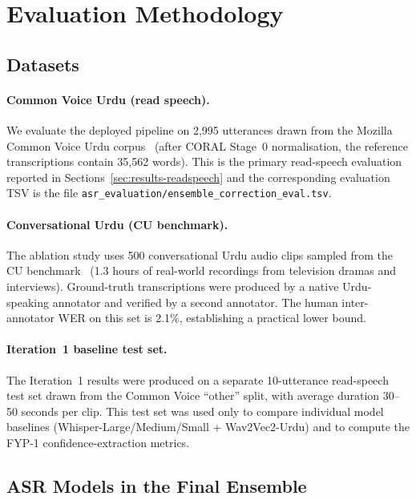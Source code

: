 \section{Evaluation Methodology}
\label{sec:eval-method}

\subsection{Datasets}
\label{ssec:datasets}

\paragraph{Common Voice Urdu (read speech).}
We evaluate the deployed pipeline on 2{,}995 utterances drawn from the Mozilla Common Voice Urdu corpus~\cite{ardila2020common} (after CORAL Stage~0 normalisation, the reference transcriptions contain 35{,}562 words). This is the primary read-speech evaluation reported in Sections~\ref{sec:results-readspeech} and the corresponding evaluation TSV is the file \texttt{asr\_evaluation/ensemble\_correction\_eval.tsv}.

\paragraph{Conversational Urdu (CU benchmark).}
The ablation study uses 500 conversational Urdu audio clips sampled from the CU benchmark~\cite{arif2024wer} (1.3 hours of real-world recordings from television dramas and interviews). Ground-truth transcriptions were produced by a native Urdu-speaking annotator and verified by a second annotator. The human inter-annotator WER on this set is 2.1\%, establishing a practical lower bound.

\paragraph{Iteration~1 baseline test set.}
The Iteration~1 results were produced on a separate 10-utterance read-speech test set drawn from the Common Voice ``other'' split, with average duration 30--50 seconds per clip. This test set was used only to compare individual model baselines (Whisper-Large/Medium/Small + Wav2Vec2-Urdu) and to compute the FYP-1 confidence-extraction metrics.

\subsection{ASR Models in the Final Ensemble}
\label{ssec:asr-models}

